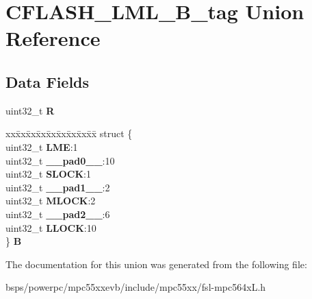 \hypertarget{unionCFLASH__LML__32B__tag}{}\section{C\+F\+L\+A\+S\+H\+\_\+\+L\+M\+L\+\_\+B\+\_\+tag Union Reference}
\label{unionCFLASH__LML__32B__tag}
\subsection*{Data Fields}
\begin{DoxyCompactItemize}
\item 
\mbox{\label{unionCFLASH__LML__32B__tag_a684f9e403dee9f2ebae13ff24ce3735e}} 
uint32\+\_\+t {\bfseries R}
\item 
\mbox{\label{unionCFLASH__LML__32B__tag_a92da888aeaa7576d4a538d3f84ebac40}} 
\begin{tabbing}
xx\=xx\=xx\=xx\=xx\=xx\=xx\=xx\=xx\=\kill
struct \{\\
\>uint32\_t {\bfseries LME}:1\\
\>uint32\_t {\bfseries \_\_pad0\_\_}:10\\
\>uint32\_t {\bfseries SLOCK}:1\\
\>uint32\_t {\bfseries \_\_pad1\_\_}:2\\
\>uint32\_t {\bfseries MLOCK}:2\\
\>uint32\_t {\bfseries \_\_pad2\_\_}:6\\
\>uint32\_t {\bfseries LLOCK}:10\\
\} {\bfseries B}\\

\end{tabbing}\end{DoxyCompactItemize}


The documentation for this union was generated from the following file\+:\begin{DoxyCompactItemize}
\item 
bsps/powerpc/mpc55xxevb/include/mpc55xx/fsl-\/mpc564x\+L.\+h\end{DoxyCompactItemize}
